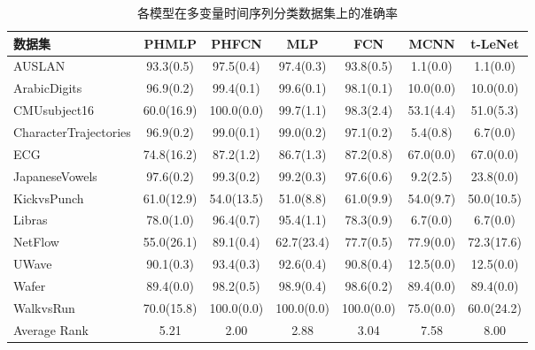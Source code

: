 \begin{table}[h!]
    \centering
    \caption{各模型在多变量时间序列分类数据集上的准确率}
    \label{tab:model_performance_multivariate_tsc}
    \begin{tabular}{lcccccc}
        \toprule
        \textbf{数据集}          & \textbf{PHMLP} & \textbf{PHFCN} & \textbf{MLP} & \textbf{FCN} & \textbf{MCNN} & \textbf{t-LeNet} \\ %
        \midrule
        AUSLAN                & 93.3(0.5)      & 97.5(0.4)      & 97.4(0.3)    & 93.8(0.5)    & 1.1(0.0)      & 1.1(0.0)         \\
        ArabicDigits          & 96.9(0.2)      & 99.4(0.1)      & 99.6(0.1)    & 98.1(0.1)    & 10.0(0.0)     & 10.0(0.0)        \\
        CMUsubject16          & 60.0(16.9)     & 100.0(0.0)     & 99.7(1.1)    & 98.3(2.4)    & 53.1(4.4)     & 51.0(5.3)        \\
        CharacterTrajectories & 96.9(0.2)      & 99.0(0.1)      & 99.0(0.2)    & 97.1(0.2)    & 5.4(0.8)      & 6.7(0.0)         \\
        ECG                   & 74.8(16.2)     & 87.2(1.2)      & 86.7(1.3)    & 87.2(0.8)    & 67.0(0.0)     & 67.0(0.0)        \\
        JapaneseVowels        & 97.6(0.2)      & 99.3(0.2)      & 99.2(0.3)    & 97.6(0.6)    & 9.2(2.5)      & 23.8(0.0)        \\
        KickvsPunch           & 61.0(12.9)     & 54.0(13.5)     & 51.0(8.8)    & 61.0(9.9)    & 54.0(9.7)     & 50.0(10.5)       \\
        Libras                & 78.0(1.0)      & 96.4(0.7)      & 95.4(1.1)    & 78.3(0.9)    & 6.7(0.0)      & 6.7(0.0)         \\
        NetFlow               & 55.0(26.1)     & 89.1(0.4)      & 62.7(23.4)   & 77.7(0.5)    & 77.9(0.0)     & 72.3(17.6)       \\
        UWave                 & 90.1(0.3)      & 93.4(0.3)      & 92.6(0.4)    & 90.8(0.4)    & 12.5(0.0)     & 12.5(0.0)        \\
        Wafer                 & 89.4(0.0)      & 98.2(0.5)      & 98.9(0.4)    & 98.6(0.2)    & 89.4(0.0)     & 89.4(0.0)        \\
        WalkvsRun             & 70.0(15.8)     & 100.0(0.0)     & 100.0(0.0)   & 100.0(0.0)   & 75.0(0.0)     & 60.0(24.2)       \\
        \midrule
        Average Rank          & 5.21           & 2.00           & 2.88         & 3.04         & 7.58          & 8.00             \\
        \bottomrule
    \end{tabular}
\end{table}
